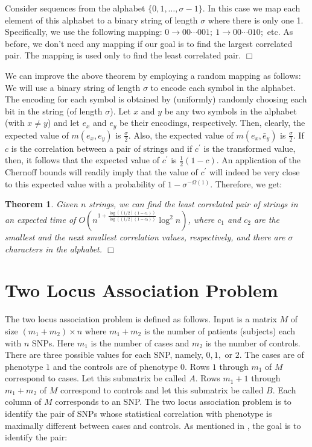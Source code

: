 \documentclass{article}
\newtheorem{theorem}{Theorem}[section]
\theoremstyle{definition}
\theoremstyle{remark}
\begin{document}
 Consider sequences from the alphabet $\{0,1,\ldots,\sigma-1\}$. In this case we map each element of this alphabet to a binary string of length $\sigma$ where there is only one 1. Specifically, we use the following mapping: $0\rightarrow 00\cdots001;~1\rightarrow 00\cdots010;$ etc. As before, we don't need any mapping if our goal is to find the largest correlated pair. The mapping is used only to find the least correlated pair. $\Box$

 We can improve the above theorem by employing a random mapping as follows: We will use a binary string of length $\sigma$ to encode each symbol in the alphabet. The encoding for each symbol is obtained by (uniformly) randomly choosing each bit in the string (of length $\sigma$). Let $x$ and $y$ be any two symbols in the alphabet (with $x\neq y$) and let $e_x$ and $e_y$ be their encodings, respectively. Then, clearly, the expected value of $m(e_x,e_y)$ is $\frac{\sigma}{2}$. Also, the expected value of $m(e_x,\bar{e}_y)$ is $\frac{\sigma}{2}$. If $c$ is the correlation between a pair of strings and if $c^\prime$ is the transformed value, then, it follows that the expected value of $c^\prime$ is $ \frac{1}{2}(1-c)$. An application of the Chernoff bounds will readily imply that the value of $c^\prime$ will indeed be very close to this expected value with a probability of $1-\sigma^{-\Omega(1)}$. Therefore, we get:

  \begin{theorem}
 Given $n$ strings,  we can find the least correlated pair of strings in an expected time of \protect\linebreak \newline $O\left (n^{1+\frac{\log ((1/2)(1-c_1))}{\log ((1/2)(1-c_2))}}\log^2n\right )$, where $c_1$ and $c_2$ are the smallest and the next smallest correlation values, respectively, and there are $\sigma$ characters in the alphabet. $\Box$
 \end{theorem}

\section{Two Locus Association Problem}\label{sec6}
The two locus association problem is defined as follows.
Input is a matrix $M$ of size $(m_1+m_2)\times n$ where $m_1 + m_2$ is the number of patients (subjects) each with $n$ SNPs. Here $m_1$ is the number of cases and $m_2$ is the number of controls. There are three possible values for each SNP, namely, $0,1,$ or $2$.  The cases are of phenotype $1$ and the controls are of phenotype $0$. Rows $1$ through $m_1$ of $M$ correspond to cases. Let this submatrix be called $A$. Rows $m_1+1$ through $m_1+m_2$ of $M$ correspond to controls and let this submatrix be called $B$. Each column of $M$ corresponds to an SNP.  The two locus association problem is to identify the pair of SNPs whose statistical correlation with phenotype is maximally different between cases and controls. As mentioned in \cite{PBK11}, the goal is to identify the pair:
\end{document}
